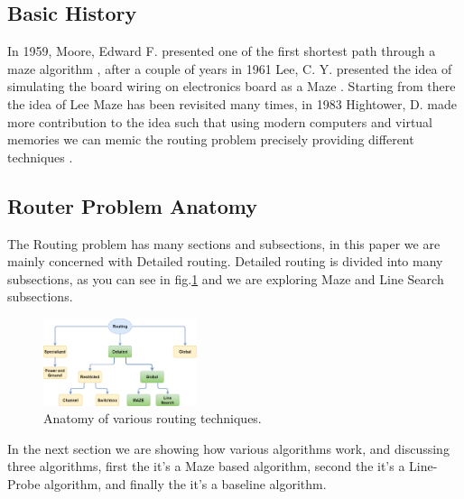 \subsection{Basic History}
    In 1959, Moore, Edward F. presented one of the first shortest path through a maze algorithm
    \cite{MooreRef}, after a couple of years in 1961 Lee, C. Y. presented the idea of simulating the 
    board wiring on electronics board as a Maze \cite{LeeRef}. Starting from there the idea of Lee Maze
    has been revisited many times, in 1983 Hightower, D. made more contribution to the idea such that
    using modern computers and virtual memories we can memic the routing problem precisely providing 
    different techniques \cite{HightowerRef}.

\subsection{Router Problem Anatomy}
    The Routing problem has many sections and subsections, in this paper we are mainly concerned with
    Detailed routing. Detailed routing is divided into many subsections, as you can see in fig.\ref{fig:routing_anat} 
    and we are exploring Maze and Line Search subsections.

    \begin{figure}[H]
        \centering
        \includegraphics[width=0.4\textwidth]{figures/routing_anatomy.png}
        \caption{Anatomy of various routing techniques.}
        \label{fig:routing_anat}
    \end{figure}

    In the next section we are showing how various algorithms work, and discussing three 
    algorithms, first the  it's a Maze based algorithm, second the 
     it's a Line-Probe algorithm, and finally the  
    it's a baseline algorithm.

